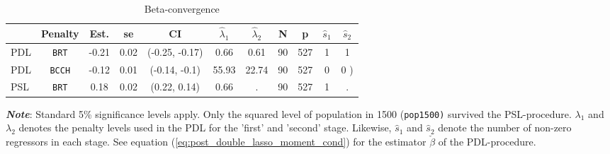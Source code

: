 \documentclass[11pt]{article}
\begin{document}
\begin{table}[H]
    \centering
    \caption{Beta-convergence}
    \begin{threeparttable}
        \begin{tabular}{lcccc|cc|cccc}
        \toprule
        {} &        Penalty &  Est. &    se &              CI &  $\hat{\lambda}_{1}$ & $\hat{\lambda}_{2}$ &   N &    p & $\hat{s}_1$ & $\hat{s}_2$ \\
        \midrule
        PDL &   \texttt{BRT} & -0.21 &  0.02 &  (-0.25, -0.17) &                 0.66 &                0.61 &  90 &  527 &           1 &           1 \\
        PDL &  \texttt{BCCH} & -0.12 &  0.01 &   (-0.14, -0.1) &                55.93 &               22.74 &  90 &  527 &           0 &           0 ) \\
        PSL &   \texttt{BRT} &  0.18 &  0.02 &    (0.22, 0.14) &                 0.66 &                   . &  90 &  527 &           1 &           .  \\
        \bottomrule
        \end{tabular}

            \begin{tablenotes}
                \footnotesize \textbf{\textit{Note}}: Standard 5\% significance levels apply. Only the squared level of population in 1500 (\texttt{pop1500)} survived the PSL-procedure. $\lambda_{1}$ and $\lambda_{2}$ denotes the penalty levels used in the PDL for the 'first' and 'second' stage. Likewise, $\hat{s}_1$ and $\hat{s}_2$ denote the number of non-zero regressors in each stage. See equation (\ref{eq:post_double_lasso_moment_cond}) for the estimator $\check{\beta}$ of the PDL-procedure.
            \end{tablenotes}
    \end{threeparttable}
    
    \label{tab:beta_convergence_lasso}
\end{table}


\end{document}
